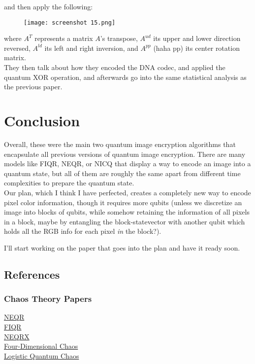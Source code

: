 \documentclass[svgnames]{article}     %
\begin{document}
and then apply the following: 

\begin{figure}[H]
  \centering
    \texttt{[image: screenshot 15.png]}
\end{figure}

where $A^T$ represents a matrix $A$'s transpose,  $A^{ud}$ its upper and lower
direction reversed,  $A^{ld}$ its left and right inversion, and  $A^{pp}$ (haha
pp) its center rotation matrix.\\

They then talk about how they encoded the DNA codec, and applied the quantum
XOR operation, and afterwards go into the same statistical
analysis as the previous paper.  


\section{Conclusion}

Overall, these were the main two quantum image encryption algorithms that
encapsulate all previous versions of quantum image encryption. There are many
models like FIQR, NEQR, or NICQ that display a way to encode an image into
a quantum state, but all of them are roughly the same apart from different time
complexities to prepare the quantum state. \\

Our plan, which I think I have perfected, creates a completely new way to
encode pixel color information, though it requires more qubits (unless we
discretize an image into blocks of qubits, while somehow retaining the
information of all pixels in a block, maybe by entangling the block-statevector
with another qubit which holds all the RGB info for each pixel \textit{in} the
block?). 

I'll start working on the paper that goes into the plan and have it ready soon.

\subsection{References}

\subsubsection{Chaos Theory Papers}

\href{https://zero.sci-hub.se/2180/25c5b2e7104ba68813ee5fc81176fb62/zhang2013.pdf}{NEQR}\\
\href{https://www.researchgate.net/publication/235800177_A_flexible_representation_of_quantum_images_for_polynomial_preparation_image_compression_and_processing_operations_Quantum_Inf}{FIQR}\\
\href{https://arxiv.org/pdf/2204.07996}{NEQRX} \\
\href{https://www.frontiersin.org/journals/physics/articles/10.3389/fphy.2024.1230294/full}{Four-Dimensional
Chaos} \\
\href{https://www.ncbi.nlm.nih.gov/pmc/articles/PMC8871303/}{Logistic Quantum
Chaos}\\
\end{document}
